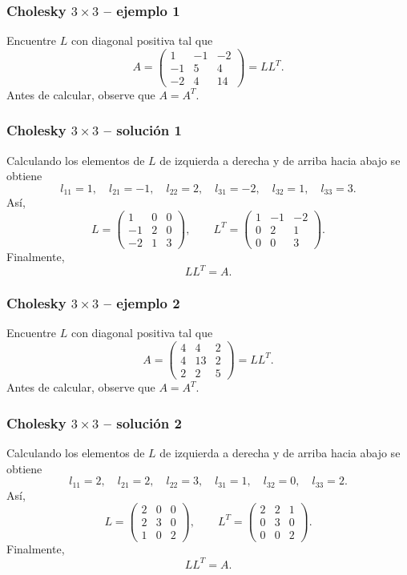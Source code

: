 \subsubsection*{Cholesky $3\times 3$ -- ejemplo 1}

Encuentre $L$ con diagonal positiva tal que
\[
A=\begin{pmatrix}1 & -1 & -2\\-1 & 5 & 4\\-2 & 4 & 14\end{pmatrix}=LL^T.
\]
Antes de calcular, observe que $A=A^T$.


\subsubsection*{Cholesky $3\times 3$ -- solución 1}

Calculando los elementos de $L$ de izquierda a derecha y de arriba hacia abajo se obtiene
\[
l_{11}=1,\quad l_{21}=-1,\quad l_{22}=2,\quad l_{31}=-2,\quad l_{32}=1,\quad l_{33}=3.
\]
Así,
\[
L=\begin{pmatrix}1 & 0 & 0\\-1 & 2 & 0\\-2 & 1 & 3\end{pmatrix},\qquad L^T=\begin{pmatrix}1 & -1 & -2\\0 & 2 & 1\\0 & 0 & 3\end{pmatrix}.
\]
Finalmente,
\[
\boxed{LL^T=A}.
\]


\subsubsection*{Cholesky $3\times 3$ -- ejemplo 2}

Encuentre $L$ con diagonal positiva tal que
\[
A=\begin{pmatrix}4 & 4 & 2\\4 & 13 & 2\\2 & 2 & 5\end{pmatrix}=LL^T.
\]
Antes de calcular, observe que $A=A^T$.


\subsubsection*{Cholesky $3\times 3$ -- solución 2}

Calculando los elementos de $L$ de izquierda a derecha y de arriba hacia abajo se obtiene
\[
l_{11}=2,\quad l_{21}=2,\quad l_{22}=3,\quad l_{31}=1,\quad l_{32}=0,\quad l_{33}=2.
\]
Así,
\[
L=\begin{pmatrix}2 & 0 & 0\\2 & 3 & 0\\1 & 0 & 2\end{pmatrix},\qquad L^T=\begin{pmatrix}2 & 2 & 1\\0 & 3 & 0\\0 & 0 & 2\end{pmatrix}.
\]
Finalmente,
\[
\boxed{LL^T=A}.
\]


